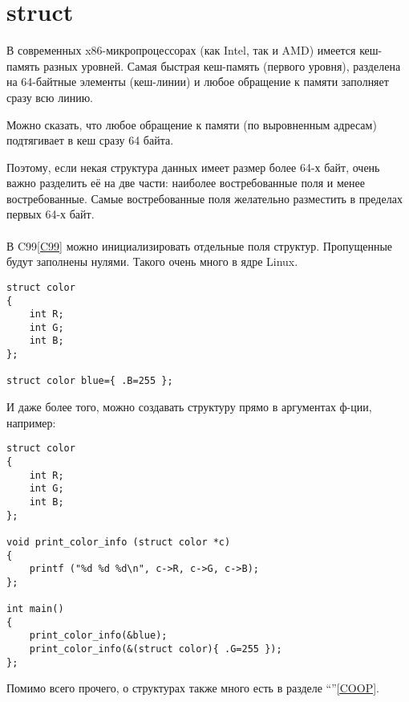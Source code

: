 ﻿\section{struct}

В современных x86-микропроцессорах (как Intel, так и AMD) имеется кеш-память разных уровней. 
Самая быстрая кеш-память (первого уровня),
разделена на 64-байтные элементы (кеш-линии) и любое обращение к памяти заполняет сразу всю линию.

Можно сказать, что любое обращение к памяти (по выровненным адресам) подтягивает в кеш сразу 64 байта.

Поэтому, если некая структура данных имеет размер более 64-х байт, очень важно разделить её на две части:
наиболее востребованные поля и менее востребованные. 
Самые востребованные поля желательно разместить в пределах первых 64-х байт. \\
\\
В C99\ref{C99} можно инициализировать отдельные поля структур. Пропущенные будут заполнены нулями. Такого очень
много в ядре Linux. 

\begin{lstlisting}
struct color
{
	int R;
	int G;
	int B;
};

struct color blue={ .B=255 };
\end{lstlisting}

И даже более того, можно создавать структуру прямо в аргументах ф-ции, например:

\begin{lstlisting}
struct color
{
	int R;
	int G;
	int B;
};

void print_color_info (struct color *c)
{
	printf ("%d %d %d\n", c->R, c->G, c->B);
};

int main()
{
	print_color_info(&blue);
	print_color_info(&(struct color){ .G=255 });
};
\end{lstlisting}

Помимо всего прочего, о структурах также много есть в разделе ``\COOPname''\ref{COOP}.

